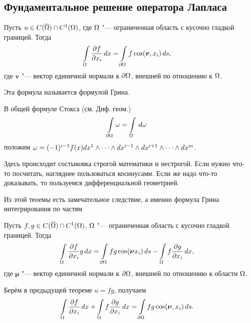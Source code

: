 \subsection{Фундаментальное решение оператора Лапласа}
\begin{The}\label{FROL1}
 Пусть $u\in C(\overline{\Omega})\cap C^1(\Omega)$, где $\Omega$ "--- ограниченная область с кусочно гладкой границей. Тогда
\[
  \int\limits_{\Omega}\frac{\partial f}{\partial x_i}\,dx = \int\limits_{\partial\Omega} f \cos(\boldsymbol v,x_i)\,ds,
\]
где $\boldsymbol v$ "--- вектор единичной нормали к $\partial\Omega$, внешней по отношению к $\Omega$.
\end{The}
Эта формула называется формулой Грина.
\begin{Proof}
  В общей формуле Стокса (см. Диф. геом.)
\[
  \int\limits_{\partial\Omega}\omega = \int\limits_{\Omega}\,d\omega
\]
положим $\omega = (-1)^{i-1}f(x)dx^1\wedge\dots\wedge dx^{i-1}\wedge dx^{i+1}\wedge\dots\wedge dx^m$.
\end{Proof}
Здесь происходит состыковка строгой математики и нестрогой. Если нужно что-то посчитать, нагляднее пользоваться косинусами. Если же надо что-то доказывать, то пользуемся дифференциальной геометрией.

Из этой теоемы есть замечательное следствие, а именно формула Грина интегрирования по частям
\begin{The}\label{FROL2}
  Пусть $f,g\in C(\overline{\Omega})\cap C^1(\Omega)$, $\Omega$ "--- ограниченная область с кусочно гладкой границей. Тогда
\[
  \int\limits_{\Omega}\frac{\partial f}{\partial x_i}g\,dx = \int\limits_{\partial\Omega} fg\cos(\boldsymbol \nu x_i)\,ds - \int\limits_{\Omega} f\frac{\partial g}{\partial x_i}\,dx,
\]
где $\boldsymbol \mu$ "--- вектор единичной нормали к $\partial\Omega$, внешней по отношению к области $\Omega$.
\end{The}
\begin{Proof}
  Берём в предыдущей теореме $u = fg$, получаем
\[
  \int\limits_{\Omega}\frac{\partial f}{\partial x_i}\,dx +\int\limits_{\Omega} f\frac{\partial g}{\partial x_i}\,dx = \int\limits_{\partial\Omega}fg\cos(\boldsymbol\nu,x_i)\,ds.
\]
\end{Proof}
